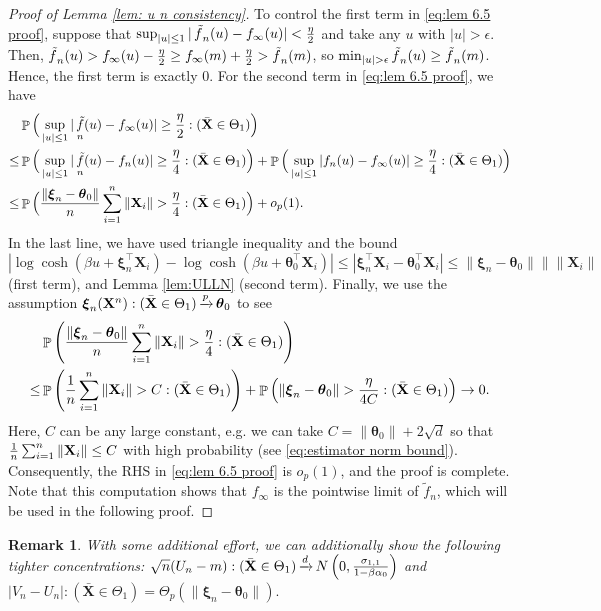\documentclass[preprint,reqno]{imsart}
\newtheorem{remark}{Remark}[section]
\newcommand{\ttheta}{\boldsymbol{\theta}}
\DeclareMathOperator{\ft}{\tilde{\mathnormal f}}
\DeclareMathOperator{\xp}{\xrightarrow{\mathnormal p}}
\DeclareMathOperator{\xd}{\xrightarrow{\mathnormal d}}
\DeclareMathOperator{\PP}{\mathbb{P}}
\newcommand{\X}{\mathbf{X}}
\newcommand{\xxi}{\boldsymbol \xi}
\DeclareMathOperator{\sumin}{\sum_{\mathnormal i=1}^{\mathnormal n}}
\begin{document}
\begin{appendix}
\begin{proof}[Proof of Lemma \ref{lem: u n consistency}]
To control the first term in \eqref{eq:lem 6.5 proof}, suppose that $\sup_{|u| \le 1} |\ft_n(u) - f_{\infty}(u)| < \frac{\eta}{2}$ and take any $u$ with $|u| > \epsilon$. Then, $\ft_n(u) > f_{\infty}(u) - \frac{\eta}{2} \ge f_{\infty}(m) + \frac{\eta}{2} > \ft_n(m)$, so $\min_{|u| > \epsilon} \ft_n(u) \ge \ft_n(m)$. Hence, the first term is exactly 0. 
For the second term in \eqref{eq:lem 6.5 proof}, we have
\begin{align*}
    & \PP \Big(\sup_{|u| \le 1} |\ft_n(u) - f_{\infty}(u)| \ge \frac{\eta}{2} : (\bar{\X} \in \Theta_1)\Big) \\
    \le & \PP \Big(\sup_{|u| \le 1} |\ft_n(u) - f_{n}(u)| \ge \frac{\eta}{4} : (\bar{\X} \in \Theta_1)\Big) + \PP \Big(\sup_{|u| \le 1} |f_n(u) - f_{\infty}(u)| \ge \frac{\eta}{4} : (\bar{\X} \in \Theta_1)\Big) \\
    \le & \PP \Big(\frac{\|\xxi_n - \ttheta_0\|}{n} \sumin \|\X_i\| > \frac{\eta}{4} : (\bar{\X} \in \Theta_1) \Big)+ o_p(1).
\end{align*}
In the last line, we have used triangle inequality and the bound $$|\log \cosh(\beta u + \xxi_n^\top \X_i) - \log \cosh(\beta u + \ttheta_0^\top \X_i)| \le |\xxi_n^\top \X_i - \ttheta_0^\top \X_i| \le \|\xxi_n - \ttheta_0\| \|\|\X_i\|$$ (first term), and Lemma \ref{lem:ULLN} (second term).
Finally, we use the assumption $\xxi_n(\X^n) : (\bar{\X} \in \Theta_1) \xp \ttheta_0$ to see
\begin{align*}
    &\PP \left(\frac{\|\xxi_n - \ttheta_0\|}{n} \sumin \|\X_i\| > \frac{\eta}{4} : (\bar{\X} \in \Theta_1) \right) \\
    \le& \PP \left(\frac{1}{n} \sumin \|\X_i\| > C : (\bar{\X} \in \Theta_1) \right) + \PP \left(\|\xxi_n - \ttheta_0\|  > \frac{\eta}{4C} : (\bar{\X} \in \Theta_1) \right) \to 0.
\end{align*}
Here, $C$ can be any large constant, e.g. we can take $C = \|\ttheta_0\| + 2\sqrt{d}$ so that $\frac{1}{n}\sumin \|\X_i\| \le C$ with high probability (see \eqref{eq:estimator norm bound}).
Consequently, the RHS in \eqref{eq:lem 6.5 proof} is $o_p(1)$, and the proof is complete. Note that this computation shows that $f_\infty$ is the pointwise limit of $\tilde{f}_n$, which will be used in the following proof.

%
%
%
%
%
%
%
%
%
%
%
%
%
 
%

\end{proof}

\begin{remark}
    With some additional effort, we can additionally show the following tighter concentrations: $\sqrt{n}(U_n - m) : (\bar{\X} \in \Theta_1) \xd N \left(0, \frac{\sigma_{1,1}}{1 - \beta \alpha_0} \right)$
    and $|V_n - U_n|: (\bar{\X} \in \Theta_1) = \Theta_p(\|\xxi_n - \ttheta_0\| ).$
\end{remark}


\end{appendix}
\end{document}
